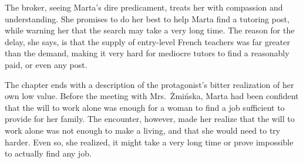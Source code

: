 The broker, seeing Marta's dire predicament, treats her with compassion and understanding.
She promises to do her best to help Marta find a tutoring post, while warning her that the search may take a very long time.
The reason for the delay, she says, is that the supply of entry-level French teachers was far greater than the demand, making it very hard for mediocre tutors to find a reasonably paid, or even any post.

The chapter ends with a description of the protagonist's bitter realization of her own low value.
Before the meeting with Mrs.\ Żmińska, Marta had been confident that the will to work alone was enough for a woman to find a job sufficient to provide for her family.
The encounter, however, made her realize that the will to work alone was not enough to make a living, and that she would need to try harder.
Even so, she realized, it might take a very long time or prove impossible to actually find any job.
